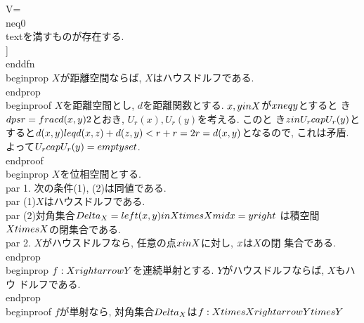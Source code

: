  V=\\neq0\\text{を満すものが存在する.}
 \\]
\\end{dfn}
\\begin{prop}
 $X$が距離空間ならば, $X$はハウスドルフである.
\\end{prop}
\\begin{proof}
 $X$を距離空間とし, $d$を距離関数とする. $x, y\\in X$が$x\\neq y$とすると
 き$\\dps r=\\frac{d(x,y)}{2}$とおき, $U_{r}(x), U_{r}(y)$を考える. このと
 き$z\\in U_{r}\\cap U_{r}(y)$とすると$d(x, y)\\leq d(x, z)+d(z,
 y)<r+r=2r=d(x, y)$となるので, これは矛盾. よって$U_{r}\\cap
 U_{r}(y)=\\emptyset$.
\\end{proof}
\\begin{prop}
 $X$を位相空間とする.
 \\par 1. 次の条件(1), (2)は同値である.
 \\par (1)$X$はハウスドルフである.
 \\par (2)対角集合$\\Delta_{X}=\\left\\{(x, y)\\in X\\times X\\mid x=y\\right\\}$
 は積空間$X\\times X$の閉集合である.
 \\par 2. $X$がハウスドルフなら, 任意の点$x\\in X$に対し, $\\{x\\}$は$X$の閉
 集合である.
\\end{prop}
\\begin{prop}
 $f:X\\rightarrow Y$を連続単射とする. $Y$がハウスドルフならば, $X$もハウ
 ドルフである.
\\end{prop}
\\begin{proof}
 $f$が単射なら, 対角集合$\\Delta_{X}$は$f:X\\times X\\rightarrow Y\\times Y$
